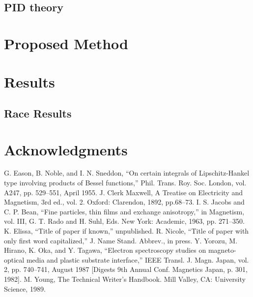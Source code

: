 \documentclass[conference]{IEEEtran}
\begin{document}
\subsection{PID theory}

\section{Proposed Method}

\section{Results}

\subsection{Race Results}


\section*{Acknowledgments}

\begin{thebibliography}{00}
 G. Eason, B. Noble, and I. N. Sneddon, ``On certain integrals of Lipschitz-Hankel type involving products of Bessel functions,'' Phil. Trans. Roy. Soc. London, vol. A247, pp. 529--551, April 1955.
 J. Clerk Maxwell, A Treatise on Electricity and Magnetism, 3rd ed., vol. 2. Oxford: Clarendon, 1892, pp.68--73.
 I. S. Jacobs and C. P. Bean, ``Fine particles, thin films and exchange anisotropy,'' in Magnetism, vol. III, G. T. Rado and H. Suhl, Eds. New York: Academic, 1963, pp. 271--350.
 K. Elissa, ``Title of paper if known,'' unpublished.
 R. Nicole, ``Title of paper with only first word capitalized,'' J. Name Stand. Abbrev., in press.
 Y. Yorozu, M. Hirano, K. Oka, and Y. Tagawa, ``Electron spectroscopy studies on magneto-optical media and plastic substrate interface,'' IEEE Transl. J. Magn. Japan, vol. 2, pp. 740--741, August 1987 [Digests 9th Annual Conf. Magnetics Japan, p. 301, 1982].
 M. Young, The Technical Writer's Handbook. Mill Valley, CA: University Science, 1989.
\end{thebibliography}
\end{document}
